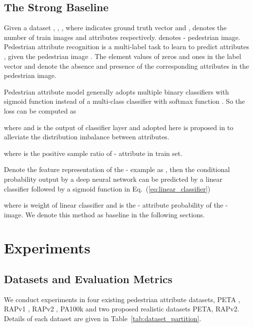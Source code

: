 \documentclass[runningheads]{llncs}
\begin{document}
\subsection{The Strong Baseline}
Given a dataset , , , where  indicates ground truth vector and ,  denotes the number of train images and attributes respectively.  denotes - pedestrian image. Pedestrian attribute recognition is a multi-label task to learn to predict attributes , given the pedestrian image . The element values of zeros and ones in the label vector  and  denote the absence and presence of the corresponding attributes in the pedestrian image.

Pedestrian attribute model generally adopts multiple binary classifiers with sigmoid function \cite{guo2019visual,tang2019Improving} instead of a multi-class classifier with softmax function \cite{wang2017normface,deng2019arcface}. So the loss can be computed as 

where  and  is the output of classifier layer and  adopted here is proposed in \cite{li2018pose} to alleviate the distribution imbalance between attributes.

where  is the positive sample ratio of - attribute in train set. 




Denote the feature representation of the - example as  , then the conditional probability output by a deep neural network can be predicted by a linear classifier followed by a sigmoid function in Eq.~(\ref{eq:linear_classifier})

where  is weight of linear classifier and  is the - attribute probability of the - image. We denote this method as baseline in the following sections.


\section{Experiments} \label{exp}

\subsection{Datasets and Evaluation Metrics}

We conduct experiments in four existing pedestrian attribute datasets, PETA \cite{deng2014pedestrian}, RAPv1 \cite{li2016richly}, RAPv2 \cite{li2018richly}, PA100k \cite{liu2017hydraplus} and two proposed realistic datasets PETA\textsubscript{}, RAPv2\textsubscript{}. Details of each dataset are given in Table~\ref{tab:dataset_partition}.
\end{document}
